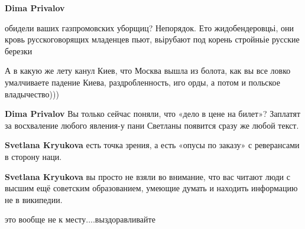 \begin{itemize}
\begin{itemize}
\textbf{Dima Privalov} 

обидели ваших газпромовских уборщиц? Непорядок. Ето жидобендеровцьі, они кровь
русскоговорящих младенцев пьют, вьірубают под корень стройньіе русские березки

 
А в какую же лету канул Киев, что Москва вышла из болота, как вы все ловко умалчиваете падение Киева, раздробленность, иго орды, а потом и польское владычество)))

 
\textbf{Dima Privalov} Вы только сейчас поняли, что «дело в цене на билет»? Заплатят за восхваление любого явления-у пани Светланы появится сразу же любой текст.

 
\textbf{Svetlana Kryukova} есть точка зрения, а есть «опусы по заказу» с реверансами в сторону наци.

 
\textbf{Svetlana Kryukova} вы просто не взяли во внимание, что вас читают люди с высшим ещё советским образованием, умеющие думать и находить информацию не в википедии.

 
это вообще не к месту....выздоравливайте

 

\end{itemize}
\end{itemize}
